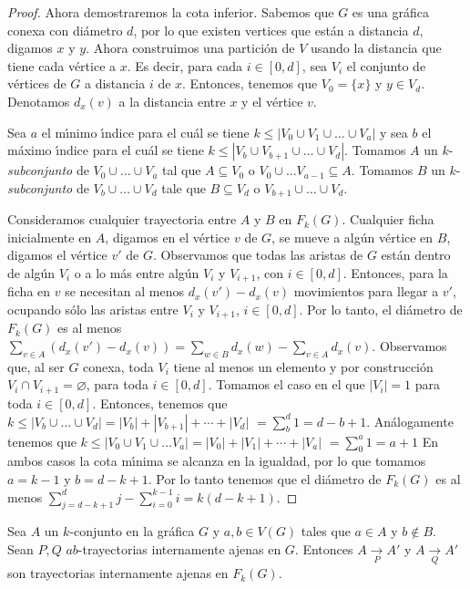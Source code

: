 \begin{proof}
Ahora demostraremos la cota inferior. Sabemos que $G$ es una gr\'afica conexa
con di\'ametro $d$, por lo que existen vertices que est\'an a distancia
$d$, digamos $x$ y $y$. Ahora construimos una partici\'on de $V$ usando  la
distancia que tiene cada v\'ertice a $x$. Es decir, para cada $i\in [0,d]$,
sea $V_{i}$ el conjunto de v\'ertices de $G$ a distancia $i$ de $x$. Entonces,
tenemos que $V_{0}=\{x\}$ y $y\in V_{d}$. Denotamos $d_x(v)$ a la distancia
entre $x$ y el v\'ertice $v$.

Sea $a$ el m\'\i{}nimo \'\i{}ndice para el cu\'al se tiene $k \leq |V_{0}\cup
V_{1}\cup \dots \cup V_{a}|$ y sea $b$ el m\'aximo \'\i{}ndice para el cu\'al se
tiene $k\leq |V_{b}\cup V_{b+1}\cup \dots \cup V_{d}|$. Tomamos $A$ un
$k$-\textit{subconjunto} de $V_{0}\cup \dots \cup V_{a}$  tal que $A\subseteq
V_{0}$ o $V_{0}\cup \dots V_{a-1}\subseteq A$. Tomamos $B$ un
$k$-\textit{subconjunto} de $V_{b}\cup \dots \cup V_{d}$ tale que
$B\subseteq V_{d}$ o $V_{b+1}\cup \dots \cup V_{d}$. 

Consideramos cualquier trayectoria entre $A$ y $B$ en $F_{k}(G)$. Cualquier
ficha inicialmente en $A$, digamos en el v\'ertice $v$ de $G$, se mueve a
alg\'un v\'ertice en $B$, digamos el v\'ertice $v'$ de $G$. Observamos que todas
las aristas de $G$ est\'an dentro de alg\'un $V_{i}$ o a lo m\'as entre alg\'un
$V_{i}$ y $V_{i+1}$, con $i\in[0,d]$. Entonces, para la ficha en $v$ se
necesitan al menos $d_x(v')-d_x(v)$ movimientos para llegar a $v'$, ocupando
s\'olo las aristas entre $V_{i}$ y $V_{i+1}$, $i\in [0,d]$. Por lo tanto,
el di\'ametro de $F_{k}(G)$ es al menos $\sum_{v\in A}(d_x(v')-d_x(v))=
\sum_{w\in B}d_x(w)-\sum_{v\in A}d_x(v)$. Observamos que, al ser $G$ conexa,
toda $V_{i}$ tiene al menos un elemento y por construcci\'on $V_{i} \cap
V_{i+1}=\varnothing$, para toda $i\in [0,d]$. Tomamos el caso en el que
$|V_{i}|=1$ para toda $i\in [0,d]$. Entonces, tenemos que $k\leq
|V_{b}\cup\dots\cup V_{d}|=|V_{b}|+|V_{b+1}|+\cdots +|V_d|$
$=\sum_{b}^{d}1 = d -b+1$. An\'alogamente tenemos que $k\leq
|V_{0}\cup V_{1}\cup \dots V_{a}|=|V_{0}|+|V_{1}|+\cdots + |V_{a}|$
$=\sum_{0}^{a} 1 = a+1$ En ambos casos la cota m\'\i{}nima se alcanza en la
igualdad, por lo que tomamos $a=k-1$ y $b=d-k+1$. Por lo tanto tenemos que
el di\'ametro de $F_{k}(G)$ es al menos $\sum_{j=d -k+1}^{d}j -
\sum_{i=0}^{k-1}i = k(d-k+1)$.
\end{proof}


\begin{lema}%
\label{lem:primero}
Sea $A$ un $k$-conjunto en la gr\'afica $G$ y $a, b \in V(G)$ tales que
$a \in A$ y $b \notin B$. Sean $P, Q$ $ab$-trayectorias internamente
ajenas en $G$. Entonces $A \xrightarrow[P]{} A'$ y $A \xrightarrow[Q]{} A'$ son
trayectorias internamente ajenas en $F_{k}(G)$.
\end{lema}

